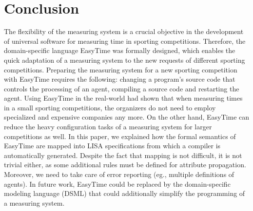 \documentclass[preprint, prX]{revtex4}
\begin{document}
\section{Conclusion}
The flexibility of the measuring system is a crucial objective in the development of universal software for measuring time in sporting
competitions. Therefore, the domain-specific language EasyTime was formally designed, which enables the quick adaptation of a measuring
system to the new requests of different sporting competitions. Preparing the measuring system for a new sporting competition with EasyTime requires the following: changing a program's source code that controls the processing of an agent, compiling a source code and restarting the agent. Using EasyTime in the real-world had shown that when measuring times in a small sporting competitions, the organizers do not need to employ specialized and expensive companies any more. On the other hand, EasyTime can reduce the heavy configuration tasks of a measuring system for larger competitions as well. In this paper, we explained how the formal semantics of EasyTime are mapped into LISA specifications from which a compiler is automatically generated. Despite the fact that mapping is not difficult, it is not trivial either, as some additional rules must be defined for attribute propagation. Moreover, we need to take care of error reporting (eg., multiple definitions of agents). In future work, EasyTime could be replaced by the domain-specific modeling language (DSML) that could additionally simplify the programming of a measuring system.




\end{document}
